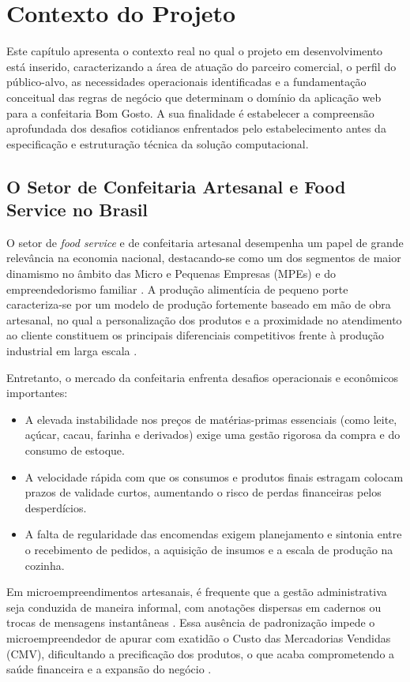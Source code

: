 \chapter{Contexto do Projeto}
Este capítulo apresenta o contexto real no qual o projeto em desenvolvimento está inserido, caracterizando a área de atuação do parceiro comercial, o perfil do público-alvo, as necessidades operacionais identificadas e a fundamentação conceitual das regras de negócio que determinam o domínio da aplicação web para a confeitaria Bom Gosto. A sua finalidade é estabelecer a compreensão aprofundada dos desafios cotidianos enfrentados pelo estabelecimento antes da especificação e estruturação técnica da solução computacional.

\section{O Setor de Confeitaria Artesanal e Food Service no Brasil}
O setor de \textit{food service} e de confeitaria artesanal desempenha um papel de grande relevância na economia nacional, destacando-se como um dos segmentos de maior dinamismo no âmbito das Micro e Pequenas Empresas (MPEs) e do empreendedorismo familiar \cite{sebrae2023}. A produção alimentícia de pequeno porte caracteriza-se por um modelo de produção fortemente baseado em mão de obra artesanal, no qual a personalização dos produtos e a proximidade no atendimento ao cliente constituem os principais diferenciais competitivos frente à produção industrial em larga escala \cite{chiavenato2021}.

Entretanto, o mercado da confeitaria enfrenta desafios operacionais e econômicos importantes:

\begin{itemize}
    \item A elevada instabilidade nos preços de matérias-primas essenciais (como leite, açúcar, cacau, farinha e derivados) exige uma gestão rigorosa da compra e do consumo de estoque.
    \item A velocidade rápida com que os consumos e produtos finais estragam colocam prazos de validade curtos, aumentando o risco de perdas financeiras pelos desperdícios.
    \item A falta de regularidade das encomendas exigem planejamento e sintonia entre o recebimento de pedidos, a aquisição de insumos e a escala de produção na cozinha.
\end{itemize}

Em microempreendimentos artesanais, é frequente que a gestão administrativa seja conduzida de maneira informal, com anotações dispersas em cadernos ou trocas de mensagens instantâneas \cite{laudon2014}. Essa ausência de padronização impede o microempreendedor de apurar com exatidão o Custo das Mercadorias Vendidas (CMV), dificultando a precificação dos produtos, o que acaba comprometendo a saúde financeira e a expansão do negócio \cite{pressman2021}.

